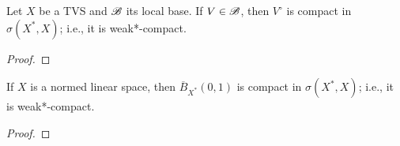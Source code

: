 \begin{theorem}
	Let $X$ be a TVS and $\mathscr{B}$ its local base. If $V \in \mathscr{B}$, then $V^\circ$ is compact in $\sigma(X^\ast,X)$; i.e., it is weak*-compact.
\end{theorem}
	{\color{red}
	\begin{proof}
			
	\end{proof}}

\begin{theorem}
	If $X$ is a normed linear space, then $\overline{B}_{X^\ast}(0,1)$ is compact in $\sigma(X^\ast,X)$; i.e., it is weak*-compact.
\end{theorem}
	{\color{red}
	\begin{proof}
			
	\end{proof}}


